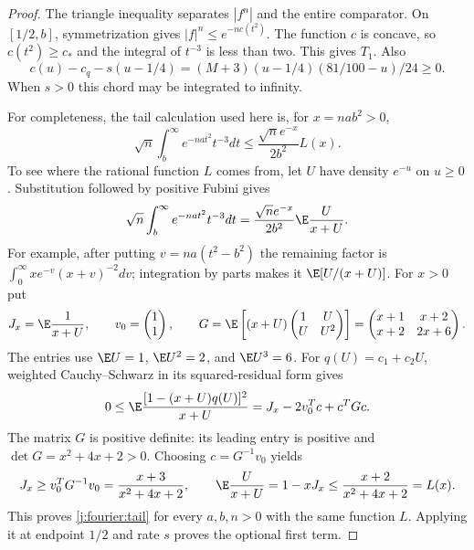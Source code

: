 \begin{proof}
The triangle inequality separates $|f^n|$ and the entire comparator.
On $[1/2,b]$, symmetrization gives $|f|^n\le e^{-nc(t^2)}$.
The function $c$ is concave, so $c(t^2)\ge c_*$ and the integral
of $t^{-3}$ is less than two. This gives $T_1$.
Also
\[
 c(u)-c_q-s(u-1/4)=(M+3)(u-1/4)(81/100-u)/24\ge0.
\]
When $s>0$ this chord may be integrated to infinity.

For completeness, the tail calculation used here is, for $x=na b^2>0$,
\begin{equation}\label{j:fourier:tail}
 \sqrt n\int_b^\infty e^{-na t^2}t^{-3}dt
 \le\frac{\sqrt n e^{-x}}{2b^2}L(x).
\end{equation}
To see where the rational function $L$ comes from, let $U$ have density
$e^{-u}$ on $u\ge0$. Substitution followed by positive Fubini gives
\[
 \sqrt n\int_b^\infty e^{-na t^2}t^{-3}dt
 =\frac{\sqrt n e^{-x}}{2b^2}\E\frac{U}{x+U}.
\]
For example, after putting $v=na(t^2-b^2)$ the remaining factor is
$\int_0^\infty xe^{-v}(x+v)^{-2}dv$; integration by parts makes it
$\E[U/(x+U)]$. For $x>0$ put
\[
 J_x=\E\frac1{x+U},\qquad v_0=\begin{pmatrix}1\\1\end{pmatrix},\qquad
 G=\E\left[(x+U)\begin{pmatrix}1&U\\U&U^2\end{pmatrix}\right]
 =\begin{pmatrix}x+1&x+2\\x+2&2x+6\end{pmatrix}.
\]
The entries use $\E U=1$, $\E U^2=2$, and $\E U^3=6$.
For $q(U)=c_1+c_2U$, weighted Cauchy--Schwarz in its squared-residual
form gives
\[
 0\le\E\frac{[1-(x+U)q(U)]^2}{x+U}
 =J_x-2v_0^Tc+c^TGc.
\]
The matrix $G$ is positive definite: its leading entry is positive and
$\det G=x^2+4x+2>0$. Choosing $c=G^{-1}v_0$ yields
\[
 J_x\ge v_0^TG^{-1}v_0=\frac{x+3}{x^2+4x+2},\qquad
 \E\frac{U}{x+U}=1-xJ_x\le\frac{x+2}{x^2+4x+2}=L(x).
\]
This proves \eqref{j:fourier:tail} for every $a,b,n>0$ with the same
function $L$. Applying it at endpoint
$1/2$ and rate $s$ proves the optional first term.


\end{proof}
